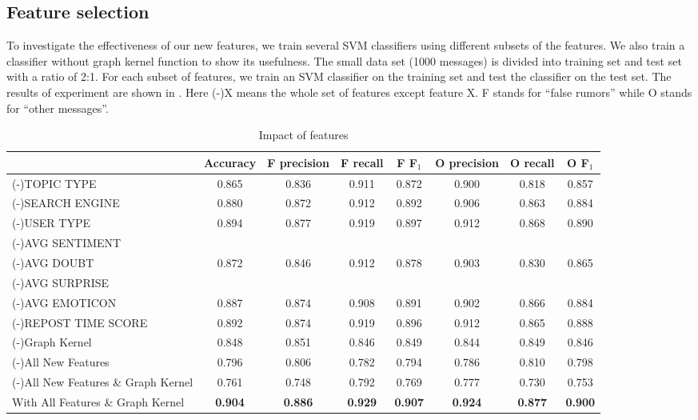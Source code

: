 \subsection{Feature selection}
\label{sec:imf}
To investigate the effectiveness of our new features,
we train several SVM classifiers using different subsets of the features.
We also train a classifier without graph kernel function to show its
usefulness. The small data set (1000 messages)
is divided into training set and test set with a ratio of 2:1.
For each subset of features, we train an SVM classifier
on the training set and test the classifier on the test set.
The results of experiment are shown in .
Here (-)X means the whole set of features except feature X. F stands for
``false rumors'' while O stands for ``other messages''.

\begin{table*}[ht]
\centering
\small
\caption{Impact of features}\label{table:result-features}
\begin{tabular}{@{}lccccccc@{}}
\toprule
\multicolumn{1}{c}{\textbf{}}              & Accuracy & F precision & F recall & F F$_1$ & O precision & O recall & O F$_1$ \\ \midrule
(-)TOPIC TYPE                              & 0.865    & 0.836       & 0.911    & 0.872   & 0.900       & 0.818    & 0.857   \\ \hline
(-)SEARCH ENGINE                           & 0.880    & 0.872       & 0.912    & 0.892   & 0.906       & 0.863    & 0.884   \\ \hline
(-)USER TYPE                               & 0.894    & 0.877       & 0.919    & 0.897   & 0.912       & 0.868    & 0.890   \\ \hline
(-)AVG SENTIMENT & & & & & & \\
(-)AVG DOUBT                               & 0.872    & 0.846       & 0.912    & 0.878   & 0.903       & 0.830    & 0.865   \\
(-)AVG SURPRISE & & & & & & \\ \hline
(-)AVG EMOTICON                            & 0.887    & 0.874       & 0.908    & 0.891   & 0.902       & 0.866    & 0.884   \\ \hline
(-)REPOST TIME SCORE                       & 0.892    & 0.874       & 0.919    & 0.896   & 0.912       & 0.865    & 0.888   \\ \hline
(-)Graph Kernel & 0.848    & 0.851       & 0.846    & 0.849   & 0.844       & 0.849    & 0.846   \\ \hline
(-)All New Features & 0.796    & 0.806       & 0.782    & 0.794   & 0.786       & 0.810    & 0.798   \\ \hline
(-)All New Features \& Graph Kernel & 0.761    & 0.748       & 0.792    & 0.769   & 0.777       & 0.730    & 0.753   \\ \hline
With All Features \& Graph Kernel& {\bf 0.904}	&{\bf 0.886} &{\bf 0.929} &{\bf 0.907} &{\bf 0.924} &{\bf 0.877} &{\bf 0.900} \\ \bottomrule \end{tabular}
\end{table*}

